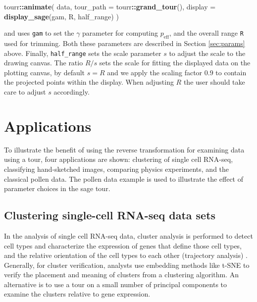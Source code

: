 \documentclass[]{interact}
\theoremstyle{plain}%
\theoremstyle{definition}
\theoremstyle{remark}
\newenvironment{Shaded}{\begin{snugshade}}{\end{snugshade}}
\newcommand{\DataTypeTok}[1]{\textcolor[rgb]{0.13,0.29,0.53}{#1}}
\newcommand{\KeywordTok}[1]{\textcolor[rgb]{0.13,0.29,0.53}{\textbf{#1}}}
\newcommand{\NormalTok}[1]{#1}
\newcommand{\OperatorTok}[1]{\textcolor[rgb]{0.81,0.36,0.00}{\textbf{#1}}}
\begin{document}
\begin{Shaded}
\begin{Highlighting}[]
\NormalTok{tourr}\OperatorTok{::}\KeywordTok{animate}\NormalTok{(}
\NormalTok{  data,}
  \DataTypeTok{tour_path =}\NormalTok{ tourr}\OperatorTok{::}\KeywordTok{grand_tour}\NormalTok{(),}
  \DataTypeTok{display =} \KeywordTok{display_sage}\NormalTok{(gam, R, half_range)}
\NormalTok{  )}
\end{Highlighting}
\end{Shaded}

\noindent and uses \texttt{gam} to set the \(\gamma\) parameter for
computing \(p_{\mathrm{eff}}\), and the overall range \texttt{R} used
for trimming. Both these parameters are described in Section
\ref{sec:params} above. Finally, \texttt{half\_range} sets the scale
parameter \(s\) to adjust the scale to the drawing canvas. The ratio
\(R/s\) sets the scale for fitting the displayed data on the plotting
canvas, by default \(s = R\) and we apply the scaling factor \(0.9\) to
contain the projected points within the display. When adjusting \(R\)
the user should take care to adjust \(s\) accordingly.

\hypertarget{sec:application}{%
\section{Applications}\label{sec:application}}

To illustrate the benefit of using the reverse transformation for
examining data using a tour, four applications are shown: clustering of
single cell RNA-seq, classifying hand-sketched images, comparing physics
experiments, and the classical pollen data. The pollen data example is
used to illustrate the effect of parameter choices in the sage tour.

\hypertarget{sec:appl1}{%
\subsection{Clustering single-cell RNA-seq data sets}\label{sec:appl1}}

In the analysis of single cell RNA-seq data, cluster analysis is
performed to detect cell types and characterize the expression of genes
that define those cell types, and the relative orientation of the cell
types to each other (trajectory analysis) \citep{Amezquita2020-at}.
Generally, for cluster verification, analysts use embedding methods like
t-SNE to verify the placement and meaning of clusters from a clustering
algorithm. An alternative is to use a tour on a small number of
principal components to examine the clusters relative to gene
expression.
\end{document}
